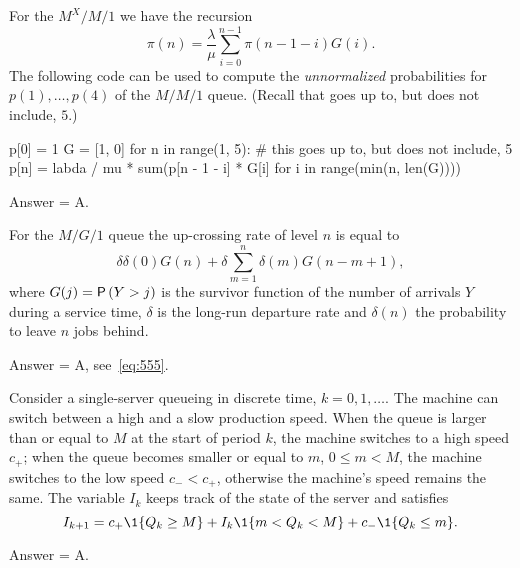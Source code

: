 \begin{exercise}[201907]
  For the $M^X/M/1$ we have the recursion
\begin{equation*}
\pi(n) = \frac \lambda \mu \sum_{i=0}^{n-1} \pi(n-1-i)G(i).
\end{equation*}
The following code can be used to compute the \emph{unnormalized} probabilities for $p(1),\ldots, p(4)$ of the $M/M/1$ queue.
(Recall that  goes up to, but does not include, $5$.)

\begin{pyverbatim}
p[0] = 1
G = [1, 0]
for n in range(1, 5): # this goes up to, but does not include, 5
    p[n] = labda / mu * sum(p[n - 1 - i] * G[i] for i in range(min(n, len(G))))

\end{pyverbatim}

\begin{solution}
Answer = A.
\end{solution}
\end{exercise}

\begin{exercise}[201907]
For the $M/G/1$ queue  the  up-crossing rate of level $n$ is equal to 
\begin{equation}
\delta \delta(0) G(n) + \delta \sum_{m=1}^n \delta(m) G(n-m+1),
\end{equation}
where $G(j) = \P{Y > j}$ is the survivor function of the number of arrivals $Y$ during a service time, $\delta$ is the long-run departure rate and $\delta(n)$ the probability to leave $n$ jobs behind. 
\begin{solution}
Answer = A, see~\cref{eq:555}.
\end{solution}
\end{exercise}

\begin{exercise}[201907]
  Consider a single-server queueing in discrete time, $k=0,1,\ldots$.
  The machine can switch between a high and a slow production speed.
  When the queue is larger than or equal to $M$ at the start of period $k$, the machine switches to a high speed $c_+$; when the queue becomes smaller or equal to $m$, $0\leq m<M$, the machine switches to the low speed $c_- < c_+$, otherwise the machine's speed remains the same.
  The  variable $I_k$  keeps track of the state of the server and satisfies
\begin{equation*}
  I_{k+1} = c_+ \1{Q_k\geq M} + I_k \1{m<Q_k<M} + c_-\1{Q_k \leq m}.
\end{equation*}
\begin{solution}
Answer = A.
\end{solution}
\end{exercise}


